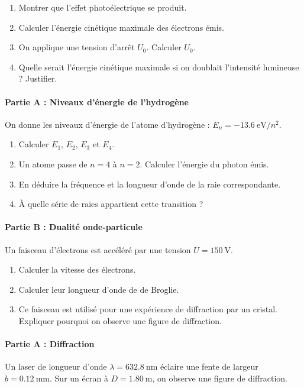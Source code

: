 \begin{enumerate}
  \item Montrer que l'effet photoélectrique se produit.
  \item Calculer l'énergie cinétique maximale des électrons émis.
  \item On applique une tension d'arrêt \(U_0\). Calculer \(U_0\).
  \item Quelle serait l'énergie cinétique maximale si on doublait l'intensité lumineuse ? Justifier.
\end{enumerate}

\paragraph{Partie A : Niveaux d'énergie de l'hydrogène}
On donne les niveaux d'énergie de l'atome d'hydrogène : \(E_n = -\SI{13.6}{\electronvolt} / n^2\).

\begin{enumerate}
  \item Calculer \(E_1\), \(E_2\), \(E_3\) et \(E_4\).
  \item Un atome passe de \(n=4\) à \(n=2\). Calculer l'énergie du photon émis.
  \item En déduire la fréquence et la longueur d'onde de la raie correspondante.
  \item À quelle série de raies appartient cette transition ?
\end{enumerate}

\paragraph{Partie B : Dualité onde-particule}
Un faisceau d'électrons est accéléré par une tension \(U = \SI{150}{\volt}\).

\begin{enumerate}
  \item Calculer la vitesse des électrons.
  \item Calculer leur longueur d'onde de de Broglie.
  \item Ce faisceau est utilisé pour une expérience de diffraction par un cristal. Expliquer pourquoi on observe une figure de diffraction.
\end{enumerate}

\paragraph{Partie A : Diffraction}
Un laser de longueur d'onde \(\lambda = \SI{632.8}{\nano\metre}\) éclaire une fente de largeur \(b = \SI{0.12}{\milli\metre}\). Sur un écran à \(D = \SI{1.80}{\metre}\), on observe une figure de diffraction.

